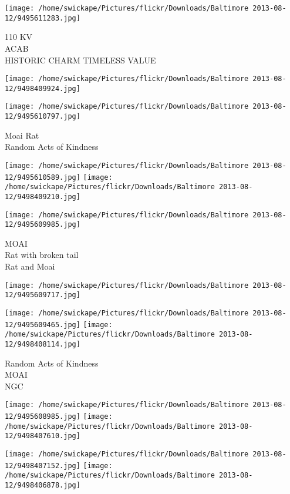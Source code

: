 \documentclass[10pt,letterpaper]{article}
\begin{document}
\vspace{0.25in}
\texttt{[image: /home/swickape/Pictures/flickr/Downloads/Baltimore 2013-08-12/9495611283.jpg]}

110 KV\\
ACAB\\
HISTORIC CHARM TIMELESS VALUE
\pagebreak

\texttt{[image: /home/swickape/Pictures/flickr/Downloads/Baltimore 2013-08-12/9498409924.jpg]}

\vspace{0.25in}
\texttt{[image: /home/swickape/Pictures/flickr/Downloads/Baltimore 2013-08-12/9495610797.jpg]}

Moai Rat\\
Random Acts of Kindness
\pagebreak

\texttt{[image: /home/swickape/Pictures/flickr/Downloads/Baltimore 2013-08-12/9495610589.jpg]}
\texttt{[image: /home/swickape/Pictures/flickr/Downloads/Baltimore 2013-08-12/9498409210.jpg]}

\texttt{[image: /home/swickape/Pictures/flickr/Downloads/Baltimore 2013-08-12/9495609985.jpg]}

MOAI\\
Rat with broken tail\\
Rat and Moai
\pagebreak

\texttt{[image: /home/swickape/Pictures/flickr/Downloads/Baltimore 2013-08-12/9495609717.jpg]}

\vspace{0.25in}
\texttt{[image: /home/swickape/Pictures/flickr/Downloads/Baltimore 2013-08-12/9495609465.jpg]}
\texttt{[image: /home/swickape/Pictures/flickr/Downloads/Baltimore 2013-08-12/9498408114.jpg]}

Random Acts of Kindness\\
MOAI\\
NGC
\pagebreak

\texttt{[image: /home/swickape/Pictures/flickr/Downloads/Baltimore 2013-08-12/9495608985.jpg]}
\texttt{[image: /home/swickape/Pictures/flickr/Downloads/Baltimore 2013-08-12/9498407610.jpg]}

\texttt{[image: /home/swickape/Pictures/flickr/Downloads/Baltimore 2013-08-12/9498407152.jpg]}
\texttt{[image: /home/swickape/Pictures/flickr/Downloads/Baltimore 2013-08-12/9498406878.jpg]}
\end{document}
